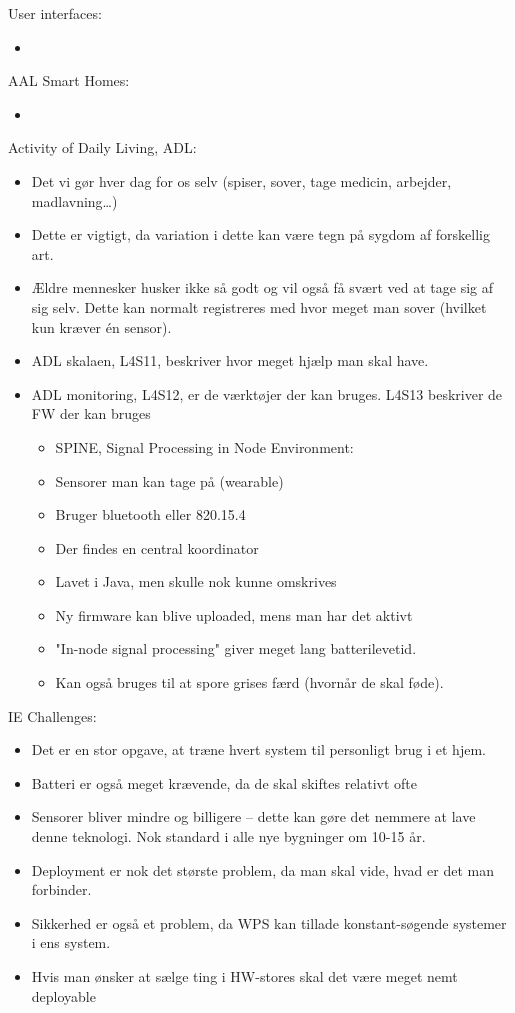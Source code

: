 \documentclass[oneside, 10pt]{article}
\begin{document}
User interfaces:
\begin{itemize}
	\item 
\end{itemize}


AAL Smart Homes:
\begin{itemize}
	\item 
\end{itemize}


Activity of Daily Living, ADL:
\begin{itemize}
	\item Det vi gør hver dag for os selv (spiser, sover, tage medicin, arbejder, madlavning\dots)
	\item Dette er vigtigt, da variation i dette kan være tegn på sygdom af forskellig art.
	\item Ældre mennesker husker ikke så godt og vil også få svært ved at tage sig af sig selv. Dette kan normalt registreres med hvor meget man sover (hvilket kun kræver én sensor).
	\item ADL skalaen, L4S11, beskriver hvor meget hjælp man skal have.
	\item ADL monitoring, L4S12, er de værktøjer der kan bruges. L4S13 beskriver de FW der kan bruges
	\begin{itemize}
		\item SPINE, Signal Processing in Node Environment:
		\item Sensorer man kan tage på (wearable)
		\item Bruger bluetooth eller 820.15.4
		\item Der findes en central koordinator
		\item Lavet i Java, men skulle nok kunne omskrives
		\item Ny firmware kan blive uploaded, mens man har det aktivt
		\item "In-node signal processing" giver meget lang batterilevetid.
		\item Kan også bruges til at spore grises færd (hvornår de skal føde).
	\end{itemize}
\end{itemize}


IE Challenges:
\begin{itemize}
	\item Det er en stor opgave, at træne hvert system til personligt brug i et hjem.
	\item Batteri er også meget krævende, da de skal skiftes relativt ofte
	\item Sensorer bliver mindre og billigere -- dette kan gøre det nemmere at lave denne teknologi. Nok standard i alle nye bygninger om 10-15 år.
	\item Deployment er nok det største problem, da man skal vide, hvad er det man forbinder.
	\item Sikkerhed er også et problem, da WPS kan tillade konstant-søgende systemer i ens system.
	\item Hvis man ønsker at sælge ting i HW-stores skal det være meget nemt deployable
\end{itemize}
\end{document}
